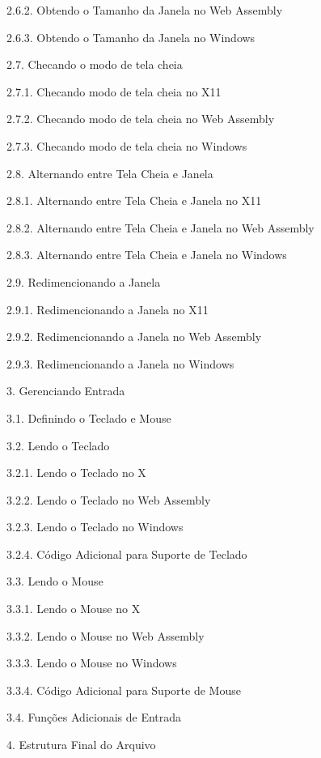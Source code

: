 2.6.2. Obtendo o Tamanho da Janela no Web Assembly 

2.6.3. Obtendo o Tamanho da Janela no Windows 

2.7. Checando o modo de tela cheia 

2.7.1. Checando modo de tela cheia no X11 

2.7.2. Checando modo de tela cheia no Web Assembly 

2.7.3. Checando modo de tela cheia no Windows 

2.8. Alternando entre Tela Cheia e Janela 

2.8.1. Alternando entre Tela Cheia e Janela no X11 

2.8.2. Alternando entre Tela Cheia e Janela no Web Assembly 

2.8.3. Alternando entre Tela Cheia e Janela no Windows 

2.9. Redimencionando a Janela 

2.9.1. Redimencionando a Janela no X11 

2.9.2. Redimencionando a Janela no Web Assembly 

2.9.3. Redimencionando a Janela no Windows 

3. Gerenciando Entrada 

3.1. Definindo o Teclado e Mouse 

3.2. Lendo o Teclado 

3.2.1. Lendo o Teclado no X 

3.2.2. Lendo o Teclado no Web Assembly 

3.2.3. Lendo o Teclado no Windows 

3.2.4. Código Adicional para Suporte de Teclado 

3.3. Lendo o Mouse 

3.3.1. Lendo o Mouse no X 

3.3.2. Lendo o Mouse no Web Assembly 

3.3.3. Lendo o Mouse no Windows 

3.3.4. Código Adicional para Suporte de Mouse 

3.4. Funções Adicionais de Entrada 

4. Estrutura Final do Arquivo 


